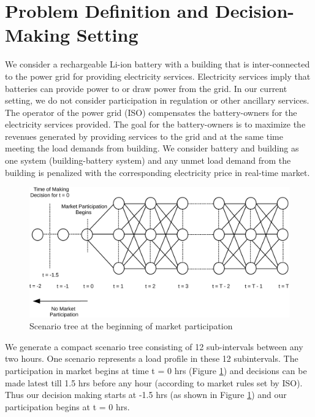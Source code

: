 \documentclass[11pt,twoside]{article}
\begin{document}
\section{Problem Definition and Decision-Making Setting}\label{sec:setting}
We consider a rechargeable Li-ion battery with a building that is inter-connected to the power grid for providing electricity services. Electricity services imply that batteries can provide power to or draw power from the grid. In our current setting, we do not consider participation in regulation or other ancillary services. The operator of the power grid (ISO) compensates the battery-owners for the electricity services provided. The goal for the battery-owners is to maximize the revenues generated by providing services to the grid and at the same time meeting the load demands from building. We consider battery and building as one system (building-battery system) and any unmet load demand from the building is penalized with the corresponding electricity price in real-time market.\\
\begin{figure}[h!]
\begin{center}
\includegraphics[width=5in]{Figures/scenario_tree-crop.pdf} \caption{Scenario tree at the beginning of market participation}\label{fig:scenario_tree}\end{center}
\end{figure}
We generate a compact scenario tree consisting of 12 sub-intervals between any two hours. One scenario represents a load profile in these 12 subintervals. The participation in market begins at time t = 0 hrs (Figure \ref{fig:scenario_tree}) and decisions can be made latest till 1.5 hrs before any hour (according to market rules set by ISO). Thus our decision making starts at -1.5 hrs (as shown in Figure \ref{fig:scenario_tree}) and our participation begins at t = 0 hrs.   
\end{document}
